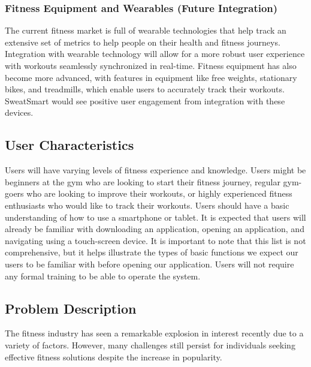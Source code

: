 \documentclass[12pt]{article}
\begin{document}
\subsubsection{Fitness Equipment and Wearables (Future Integration)}
The current fitness market is full of wearable technologies that help track an extensive set of metrics to help people on their health and fitness journeys. Integration with wearable technology will allow for a more robust user experience with workouts seamlessly synchronized in real-time. Fitness equipment has also become more advanced, with features in equipment like free weights, stationary bikes, and treadmills, which enable users to accurately track their workouts. SweatSmart would see positive user engagement from integration with these devices.

\subsection{User Characteristics}
Users will have varying levels of fitness experience and knowledge. Users might be beginners at the gym who are looking to start their fitness journey, regular gym-goers who are looking to improve their workouts, or highly experienced fitness enthusiasts who would like to track their workouts. Users should have a basic understanding of how to use a smartphone or tablet. It is expected that users will already be familiar with downloading an application, opening an application, and navigating using a touch-screen device. It is important to note that this list is not comprehensive, but it helps illustrate the types of basic functions we expect our users to be familiar with before opening our application. Users will not require any formal training to be able to operate the system.

\subsection{Problem Description}
The fitness industry has seen a remarkable explosion in interest recently due to a variety of factors. However, many challenges still persist for individuals seeking effective fitness solutions despite the increase in popularity.
\end{document}
